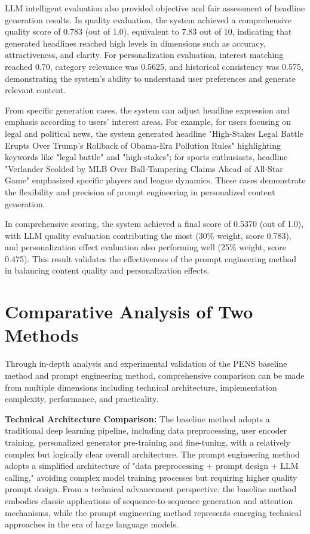 \documentclass[10pt,a4paper]{article}
\begin{document}
LLM intelligent evaluation also provided objective and fair assessment of headline generation results. In quality evaluation, the system achieved a comprehensive quality score of 0.783 (out of 1.0), equivalent to 7.83 out of 10, indicating that generated headlines reached high levels in dimensions such as accuracy, attractiveness, and clarity. For personalization evaluation, interest matching reached 0.70, category relevance was 0.5625, and historical consistency was 0.575, demonstrating the system's ability to understand user preferences and generate relevant content.

From specific generation cases, the system can adjust headline expression and emphasis according to users' interest areas. For example, for users focusing on legal and political news, the system generated headline "High-Stakes Legal Battle Erupts Over Trump's Rollback of Obama-Era Pollution Rules" highlighting keywords like "legal battle" and "high-stakes"; for sports enthusiasts, headline "Verlander Scolded by MLB Over Ball-Tampering Claims Ahead of All-Star Game" emphasized specific players and league dynamics. These cases demonstrate the flexibility and precision of prompt engineering in personalized content generation.

In comprehensive scoring, the system achieved a final score of 0.5370 (out of 1.0), with LLM quality evaluation contributing the most (30\% weight, score 0.783), and personalization effect evaluation also performing well (25\% weight, score 0.475). This result validates the effectiveness of the prompt engineering method in balancing content quality and personalization effects.

\section{Comparative Analysis of Two Methods}
Through in-depth analysis and experimental validation of the PENS baseline method and prompt engineering method, comprehensive comparison can be made from multiple dimensions including technical architecture, implementation complexity, performance, and practicality.

\textbf{Technical Architecture Comparison:} The baseline method adopts a traditional deep learning pipeline, including data preprocessing, user encoder training, personalized generator pre-training and fine-tuning, with a relatively complex but logically clear overall architecture. The prompt engineering method adopts a simplified architecture of "data preprocessing + prompt design + LLM calling," avoiding complex model training processes but requiring higher quality prompt design. From a technical advancement perspective, the baseline method embodies classic applications of sequence-to-sequence generation and attention mechanisms, while the prompt engineering method represents emerging technical approaches in the era of large language models.
\end{document}
